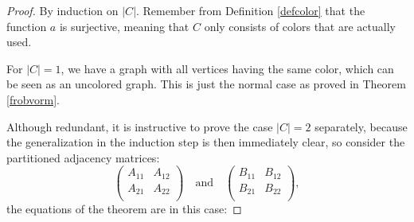 \documentclass[a4paper,11pt]{report}
\begin{document}
\begin{proof}
   By induction on $|C|$. Remember from Definition \ref{defcolor} that the function $a$ is surjective, meaning that
  $C$ only consists of colors that are actually used.
    
   For $|C|=1$, we have a graph with all vertices having the same color, which can be seen as an uncolored graph. This is just 
   the normal case as proved in Theorem \ref{frobvorm}.
      
Although redundant, it is instructive to prove the case $|C|=2$ separately, because the 
generalization in the induction step is then immediately clear, so consider 
the partitioned adjacency matrices:
$$\begin{pmatrix}
A_{11} & A_{12}\\
A_{21} & A_{22}\\
\end{pmatrix} \quad \text{and} \quad
\begin{pmatrix}
B_{11} & B_{12}\\
B_{21} & B_{22}\\
\end{pmatrix},$$
the equations of the theorem are in this case:


\end{proof}
\end{document}
